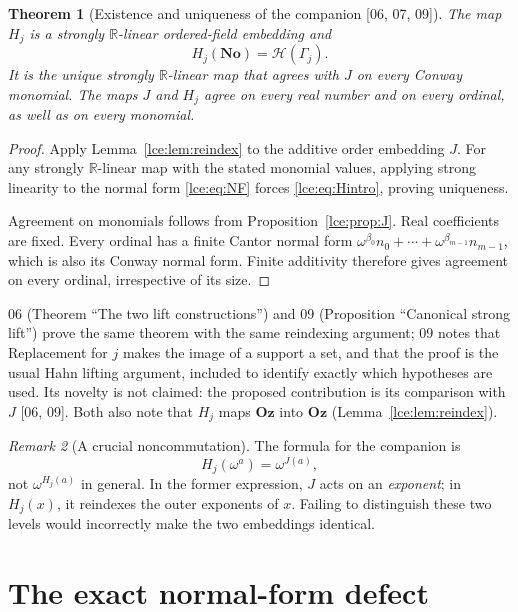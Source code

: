 \documentclass[11pt,letterpaper]{article}
\numberwithin{equation}{section}
\newtheorem{theorem}{Theorem}[section]
\theoremstyle{definition}
\theoremstyle{remark}
\newtheorem{remark}[theorem]{Remark}
\newcommand{\No}{\mathbf{No}}
\newcommand{\Oz}{\mathbf{Oz}}
\newcommand{\R}{\mathbb R}
\newcommand{\Gam}{\Gamma_j}
\newcommand{\prref}[1]{Proposition~\ref{#1}}
\newcommand{\leref}[1]{Lemma~\ref{#1}}
\newcommand{\src}[1]{\textup{\textsf{\small[#1]}}}%
\begin{document}
\begin{theorem}[Existence and uniqueness of the companion \src{06, 07, 09}]\label{lce:thm:companion}
The map $H_j$ is a strongly $\R$-linear ordered-field embedding and
\begin{equation}\label{lce:eq:Himage}
 H_j(\No)=\mathcal H(\Gam).
\end{equation}
It is the unique strongly $\R$-linear map that agrees with $J$ on every
Conway monomial. The maps $J$ and $H_j$ agree on every real number and on
every ordinal, as well as on every monomial.
\end{theorem}
\begin{proof}
Apply \leref{lce:lem:reindex} to the additive order embedding $J$.
For any strongly $\R$-linear map with the stated monomial values, applying
strong linearity to the normal form \eqref{lce:eq:NF} forces
\eqref{lce:eq:Hintro}, proving uniqueness.

Agreement on monomials follows from \prref{lce:prop:J}. Real coefficients are
fixed. Every ordinal has a finite Cantor normal form
$\omega^{\beta_0}n_0+\cdots+\omega^{\beta_{m-1}}n_{m-1}$, which is also its
Conway normal form. Finite additivity therefore gives agreement on every
ordinal, irrespective of its size.
\end{proof}
06 (Theorem ``The two lift constructions'') and 09 (Proposition ``Canonical
strong lift'') prove the same theorem with the same reindexing argument; 09
notes that Replacement for $j$ makes the image of a support a set, and that
the proof is the usual Hahn lifting argument, included to identify exactly
which hypotheses are used. Its novelty is not claimed: the proposed
contribution is its comparison with $J$ \src{06, 09}. Both also note that
$H_j$ maps $\Oz$ into $\Oz$ (\leref{lce:lem:reindex}).

\begin{remark}[A crucial noncommutation]\label{lce:rem:omega}
The formula for the companion is
\[
 H_j(\omega^a)=\omega^{J(a)},
\]
not $\omega^{H_j(a)}$ in general. In the former expression, $J$ acts on an
\emph{exponent}; in $H_j(x)$, it reindexes the outer exponents of $x$.
Failing to distinguish these two levels would incorrectly make the two
embeddings identical.
\end{remark}

\section{The exact normal-form defect}\label{lce:sec:defect}
\end{document}
